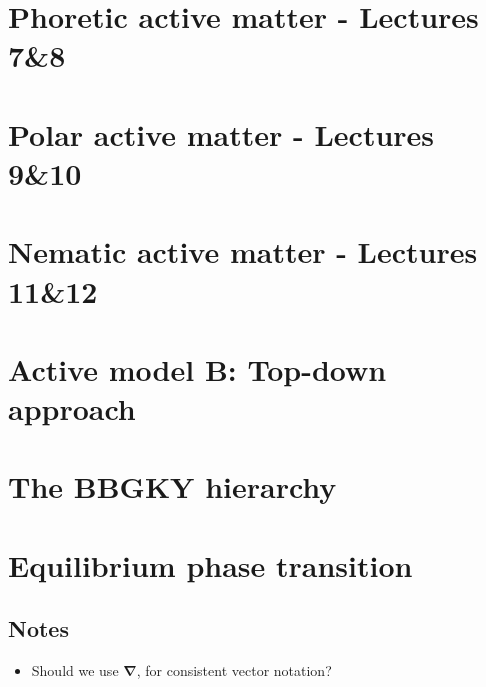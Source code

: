 \documentclass[10pt, a4paper, oneside]{book}
\begin{document}
    \chapter{Phoretic active matter - Lectures 7\&8}
    \label{chap_phoretic}
    

    \chapter{Polar active matter  - Lectures 9\&10}
    \label{chap_polar}

    \chapter{Nematic active matter  - Lectures 11\&12}
    \label{chap_nematic}
    

    \appendix

    \chapter{Active model B: Top-down approach}
    

    \chapter{The BBGKY hierarchy}
    

    \chapter{Equilibrium phase transition}
    

    
    

    
    \setcounter{tocdepth}{1}
    \listoftodos
    
    \section*{Notes}
    \begin{itemize}
        \item Should we use $\bm \nabla$, for consistent vector notation?
    \end{itemize}
\end{document}
